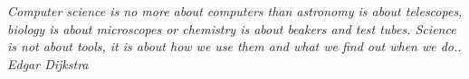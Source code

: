 
% 
%
\thispagestyle{plain}
\vspace*{\fill}

{ \raggedleft


\textit{Computer science is no more about computers than astronomy is about telescopes, biology is about microscopes or chemistry is about beakers and test tubes. Science is not about tools, it is about how we use them and what we find  out when we do.. \\
Edgar Dijkstra}

~
}